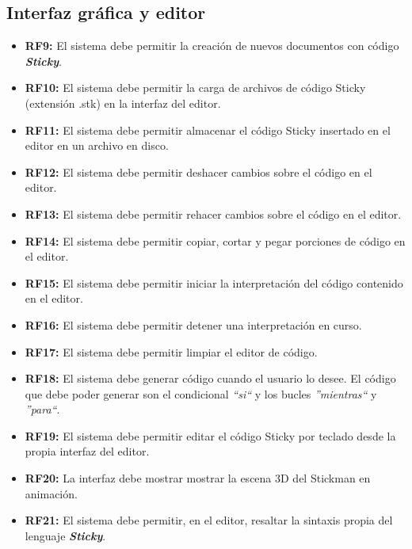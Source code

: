       \subsection{Interfaz gráfica y editor}
      \begin{itemize}
         \item \textbf{RF9:} El sistema debe permitir la creación de nuevos documentos con código \textbf{\textit{Sticky}}.
         \item \textbf{RF10:} El sistema debe permitir la carga de archivos de código Sticky (extensión .stk) en la interfaz del editor.
         \item \textbf{RF11:} El sistema debe permitir almacenar el código Sticky insertado en el editor en un archivo en disco.
         \item \textbf{RF12:} El sistema debe permitir deshacer cambios sobre el código en el editor.
         \item \textbf{RF13:} El sistema debe permitir rehacer cambios sobre el código en el editor.
         \item \textbf{RF14:} El sistema debe permitir copiar, cortar y pegar porciones de código en el editor.
         \item \textbf{RF15:} El sistema debe permitir iniciar la interpretación del código contenido en el editor.
         \item \textbf{RF16:} El sistema debe permitir detener una interpretación en curso.
         \item \textbf{RF17:} El sistema debe permitir limpiar el editor de código.
         \item \textbf{RF18:} El sistema debe generar código cuando el usuario lo desee. El código que debe poder generar son el condicional
               \textit{``si``} y los bucles \textit{''mientras``} y \textit{''para``}.
         \item \textbf{RF19:} El sistema debe permitir editar el código Sticky por teclado desde la propia interfaz del editor.
         \item \textbf{RF20:} La interfaz debe mostrar mostrar la escena 3D del Stickman en animación.
         \item \textbf{RF21:} El sistema debe permitir, en el editor, resaltar la sintaxis propia del lenguaje \textbf{\textit{Sticky}}.
      \end{itemize}

   

